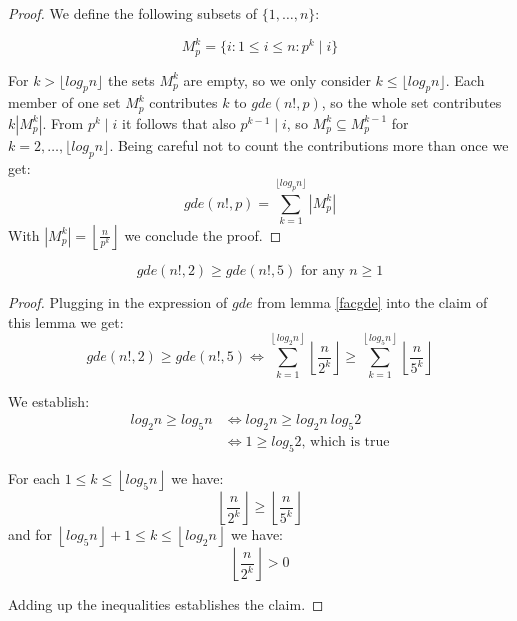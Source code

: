 \begin{proof}
We define the following subsets of $\{1,\ldots,n\}$:

\begin{equation*}
M_p^k = \{i : 1 \leq i \leq n: p^k \mid i\}
\end{equation*}

For $k > \lfloor log_p n \rfloor$ the sets $M_p^k$ are empty, so we only consider $k \leq \lfloor log_p n \rfloor$. Each member of one set $M_p^k$ contributes $k$ to $gde(n!, p)$, so the whole set contributes $k | M_p^k |$.  From $p^k \mid i$ it follows that also $p^{k - 1} \mid i$, so $M_p^k \subseteq M_p^{k - 1}$ for $k = 2,\ldots,\lfloor log_p n \rfloor$. Being careful not to count the contributions more than once we get:
\begin{equation*}
gde(n!, p) = \sum_{k = 1}^{\lfloor log_p n \rfloor}  | M_p^k |
\end{equation*}
With $| M_p^k | = \left\lfloor\frac{n}{p^k}\right\rfloor$ we conclude the proof.
\end{proof}

\begin{lem}\label{gdetwo}
\begin{equation*}
gde(n!, 2) \geq gde(n!, 5) \text{ for any } n \geq 1
\end{equation*}
\end{lem}

\begin{proof}
Plugging in the expression of $gde$ from lemma \ref{facgde} into the claim of this lemma we get:
\begin{equation*}
   gde(n!, 2) \geq gde(n!, 5) \Leftrightarrow  \sum_{k = 1}^{\left\lfloor log_2 n\right\rfloor} \left\lfloor\frac{n}{2^k}\right\rfloor  \geq \sum_{k = 1}^{\left\lfloor log_5 n\right\rfloor} \left\lfloor\frac{n}{5^k}\right\rfloor
\end{equation*}

\noindent We establish:
\begin{equation*}
\begin{split}
   log_2 n  \geq log_5 n & \Leftrightarrow  log_2 n  \geq log_2 n\ log_5 2 \\
   & \Leftrightarrow  1 \geq  log_5 2 \text{, which is true}
\end{split}   
\end{equation*}

\noindent For each $1 \leq k \leq \left\lfloor log_5 n\right\rfloor$ we have:
\begin{equation*}
 \left\lfloor\frac{n}{2^k}\right\rfloor  \geq \left\lfloor\frac{n}{5^k}\right\rfloor
\end{equation*}
and for $\left\lfloor log_5 n\right\rfloor + 1 \leq k \leq \left\lfloor log_2 n\right\rfloor$ we have:
\begin{equation*}
 \left\lfloor\frac{n}{2^k}\right\rfloor > 0
\end{equation*}

\noindent Adding up the inequalities establishes the claim.
\end{proof}

